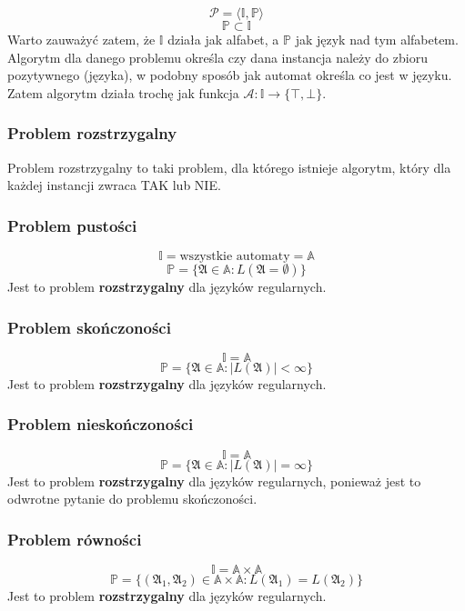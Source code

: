 \documentclass{../notatki}
\begin{document}
$$
\mathcal{P} = \langle \mathbb{I}, \mathbb{P} \rangle
$$
$$
\mathbb{P} \subset \mathbb{I}
$$
Warto zauważyć zatem, że $\mathbb{I}$ działa jak alfabet, a
$\mathbb{P}$ jak język nad tym alfabetem.
Algorytm dla danego problemu określa czy dana instancja należy do
zbioru pozytywnego (języka), w podobny sposób jak automat określa co
jest w języku.
Zatem algorytm działa trochę jak funkcja $\mathcal{A}: \mathbb{I}
\rightarrow \{\top, \bot\}$.

\subsubsection{Problem rozstrzygalny}

Problem rozstrzygalny to taki problem, dla którego istnieje algorytm,
który dla każdej instancji zwraca TAK lub NIE.

\subsubsection{Problem pustości}

$$
\mathbb{I} = \text{wszystkie automaty} = \mathbb{A}
$$
$$
\mathbb{P} = \{\mathfrak{A} \in \mathbb{A} : L(\mathfrak{A} = \emptyset)\}
$$
Jest to problem \textbf{rozstrzygalny} dla języków regularnych.

\subsubsection{Problem skończoności}

$$
\mathbb{I} = \mathbb{A}
$$
$$
\mathbb{P} = \{\mathfrak{A} \in \mathbb{A} : |L(\mathfrak{A})| < \infty\}
$$
Jest to problem \textbf{rozstrzygalny} dla języków regularnych.

\subsubsection{Problem nieskończoności}

$$
\mathbb{I} = \mathbb{A}
$$
$$
\mathbb{P} = \{\mathfrak{A} \in \mathbb{A} : |L(\mathfrak{A})| = \infty\}
$$
Jest to problem \textbf{rozstrzygalny} dla języków regularnych,
ponieważ jest to odwrotne pytanie do problemu skończoności.

\subsubsection{Problem równości}

$$
\mathbb{I} = \mathbb{A} \times \mathbb{A}
$$
$$
\mathbb{P} = \{(\mathfrak{A}_1, \mathfrak{A}_2) \in \mathbb{A} \times
\mathbb{A} : L(\mathfrak{A}_1) = L(\mathfrak{A}_2)\}
$$
Jest to problem \textbf{rozstrzygalny} dla języków regularnych.
\end{document}
